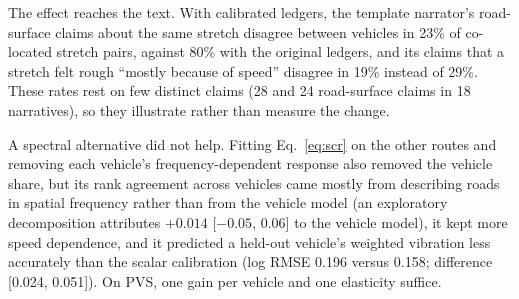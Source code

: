 The effect reaches the text.
With calibrated ledgers, the template narrator's road-surface claims about the same stretch disagree between vehicles in 23\% of co-located stretch pairs, against 80\% with the original ledgers, and its claims that a stretch felt rough ``mostly because of speed'' disagree in 19\% instead of 29\%.
These rates rest on few distinct claims (28 and 24 road-surface claims in 18 narratives), so they illustrate rather than measure the change.

A spectral alternative did not help.
Fitting Eq.~\eqref{eq:scr} on the other routes and removing each vehicle's frequency-dependent response also removed the vehicle share, but its rank agreement across vehicles came mostly from describing roads in spatial frequency rather than from the vehicle model (an exploratory decomposition attributes $+0.014$ [$-0.05$, $0.06$] to the vehicle model), it kept more speed dependence, and it predicted a held-out vehicle's weighted vibration less accurately than the scalar calibration (log RMSE 0.196 versus 0.158; difference [0.024, 0.051]).
On PVS, one gain per vehicle and one elasticity suffice.
